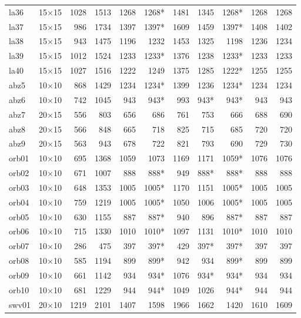 {\begin{longtable}{lrrrrrrrrrr}
la36 & 15$\times$15 & 1028 & 1513 & 1268 & 1268* & 1481 & 1345 & 1268* & 1268 & 1268 \\
la37 & 15$\times$15 & 986 & 1734 & 1397 & 1397* & 1609 & 1459 & 1397* & 1408 & 1402 \\
la38 & 15$\times$15 & 943 & 1475 & 1196 & 1232 & 1453 & 1325 & 1198 & 1236 & 1234 \\
la39 & 15$\times$15 & 1012 & 1524 & 1233 & 1233* & 1376 & 1238 & 1233* & 1233 & 1233 \\
la40 & 15$\times$15 & 1027 & 1516 & 1222 & 1249 & 1375 & 1285 & 1222* & 1255 & 1255 \\
abz5 & 10$\times$10 & 868 & 1429 & 1234 & 1234* & 1399 & 1236 & 1234* & 1234 & 1234 \\
abz6 & 10$\times$10 & 742 & 1045 & 943 & 943* & 993 & 943* & 943* & 943 & 943 \\
abz7 & 20$\times$15 & 556 & 803 & 656 & 686 & 761 & 753 & 666 & 688 & 690 \\
abz8 & 20$\times$15 & 566 & 848 & 665 & 718 & 825 & 715 & 685 & 720 & 720 \\
abz9 & 20$\times$15 & 563 & 943 & 678 & 722 & 821 & 793 & 690 & 729 & 730 \\
orb01 & 10$\times$10 & 695 & 1368 & 1059 & 1073 & 1169 & 1171 & 1059* & 1076 & 1076 \\
orb02 & 10$\times$10 & 671 & 1007 & 888 & 888* & 949 & 888* & 888* & 888 & 888 \\
orb03 & 10$\times$10 & 648 & 1353 & 1005 & 1005* & 1170 & 1151 & 1005* & 1005 & 1005 \\
orb04 & 10$\times$10 & 759 & 1219 & 1005 & 1005* & 1050 & 1006 & 1005* & 1005 & 1005 \\
orb05 & 10$\times$10 & 630 & 1155 & 887 & 887* & 940 & 896 & 887* & 887 & 887 \\
orb06 & 10$\times$10 & 715 & 1330 & 1010 & 1010* & 1097 & 1131 & 1010* & 1010 & 1010 \\
orb07 & 10$\times$10 & 286 & 475 & 397 & 397* & 429 & 397* & 397* & 397 & 397 \\
orb08 & 10$\times$10 & 585 & 1194 & 899 & 899* & 942 & 934 & 899* & 899 & 899 \\
orb09 & 10$\times$10 & 661 & 1142 & 934 & 934* & 1076 & 934* & 934* & 934 & 934 \\
orb10 & 10$\times$10 & 681 & 1229 & 944 & 944* & 1049 & 1026 & 944* & 944 & 944 \\
swv01 & 20$\times$10 & 1219 & 2101 & 1407 & 1598 & 1966 & 1662 & 1420 & 1610 & 1609 \\

\end{longtable}}
